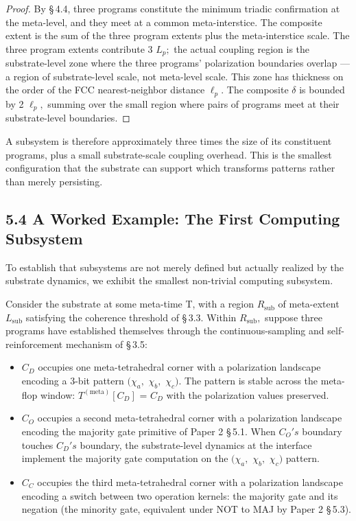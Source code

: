 \documentclass[11pt,oneside]{report}
\theoremstyle{definition}
\theoremstyle{remark}
\begin{document}
\begin{proof}
By \S\,4.4, three programs constitute the minimum triadic
confirmation at the meta-level, and they meet at a common
meta-interstice. The composite extent is the sum of the three program
extents plus the meta-interstice scale. The three program extents
contribute 3 \ensuremath{L_{p};} the actual coupling region is the substrate-level
zone where the three programs' polarization boundaries overlap --- a
region of substrate-level scale, not meta-level scale. This zone has
thickness on the order of the FCC nearest-neighbor distance \ensuremath{\ell_{p}.} The
composite \ensuremath{\delta} is bounded by 2 \ensuremath{\ell_{p},} summing over the small region where
pairs of programs meet at their substrate-level boundaries.

\end{proof}

A subsystem is therefore approximately three times the size of its
constituent programs, plus a small substrate-scale coupling overhead.
This is the smallest configuration that the substrate can support which
transforms patterns rather than merely persisting.

\subsection*{5.4 A Worked Example: The First Computing Subsystem}

To establish that subsystems are not merely defined but actually
realized by the substrate dynamics, we exhibit the smallest non-trivial
computing subsystem.

Consider the substrate at some meta-time T, with a region \ensuremath{R_{\mathrm{sub}}} of
meta-extent \ensuremath{L_{\mathrm{sub}}} satisfying the coherence threshold of \S\,3.3. Within
\ensuremath{R_{\mathrm{sub}},} suppose three programs have established themselves through the
continuous-sampling and self-reinforcement mechanism of \S\,3.5:

\begin{itemize}
\item
  \ensuremath{C_{D}} occupies one meta-tetrahedral corner with a polarization
  landscape encoding a 3-bit pattern \ensuremath{(\chi_{a},} \ensuremath{\chi_{b},} \ensuremath{\chi_{c}).} The pattern is
  stable across the meta-flop window: \ensuremath{T^{(\text{meta})}[C_{D}]} = \ensuremath{C_{D}} with
  the polarization values preserved.
\item
  \ensuremath{C_{O}} occupies a second meta-tetrahedral corner with a polarization
  landscape encoding the majority gate primitive of Paper 2 \S\,5.1. When
  \ensuremath{C_{O}'s} boundary touches \ensuremath{C_{D}'s} boundary, the substrate-level dynamics
  at the interface implement the majority gate computation on the \ensuremath{(\chi_{a},}
  \ensuremath{\chi_{b},} \ensuremath{\chi_{c})} pattern.
\item
  \ensuremath{C_{C}} occupies the third meta-tetrahedral corner with a polarization
  landscape encoding a switch between two operation kernels: the
  majority gate and its negation (the minority gate, equivalent under
  NOT to MAJ by Paper 2 \S\,5.3).
\end{itemize}
\end{document}
